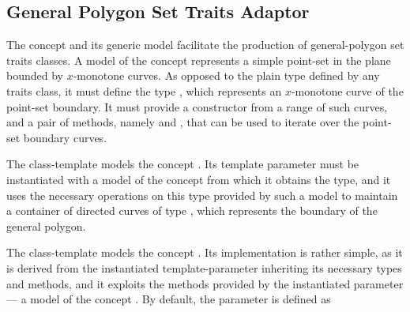 
\subsection{General Polygon Set Traits Adaptor}
\label{bso_ssec:general_polygon_concept}
The concept  and its generic model 
 facilitate the 
production of general-polygon set traits classes. A model of the concept 
 represents a simple point-set in the plane bounded 
by $x$-monotone curves. As opposed to the plain  type 
defined by any traits class, it must define the type 
, which represents an $x$-monotone curve of the 
point-set boundary. It must provide a constructor from a range of such 
curves, and a pair of methods, namely  and 
, that can be used to iterate over the point-set boundary 
curves.
 
The class-template 
models the concept . Its template parameter must be
instantiated with a model of the concept
 from which it obtains the 
 type, and it uses the necessary 
operations on this type provided by such a model to maintain a container 
of directed curves of type , which represents the 
boundary of the general polygon.

The class-template 
models the concept . Its implementation is 
rather simple, as it is derived from the instantiated template-parameter 
 inheriting its necessary types and methods, 
and it exploits the methods provided by the instantiated parameter 
 --- a model of the concept .
By default, the  parameter is defined as

